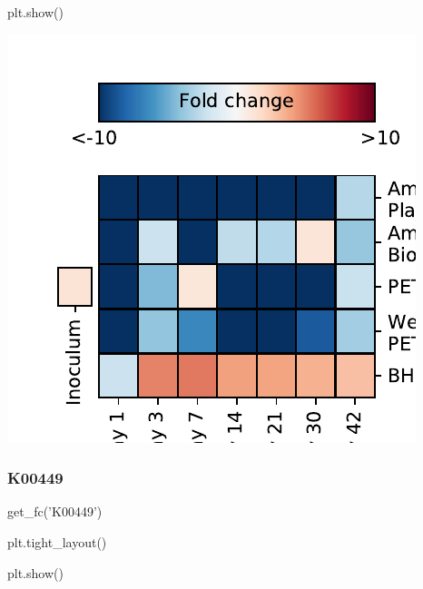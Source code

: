 \documentclass[
]{article}
\newenvironment{Shaded}{\begin{snugshade}}{\end{snugshade}}
\newcommand{\NormalTok}[1]{#1}
\newcommand{\StringTok}[1]{\textcolor[rgb]{0.31,0.60,0.02}{#1}}
\begin{document}
\begin{Shaded}
\begin{Highlighting}[]
\NormalTok{plt.show()}
\end{Highlighting}
\end{Shaded}

\includegraphics{20-6-15-PET-plastisphere-PICRUSt2_files/figure-latex/plot_fc_K00448-1.pdf}

\hypertarget{k00449-1}{%
\subsubsection{K00449}\label{k00449-1}}

\begin{Shaded}
\begin{Highlighting}[]
\NormalTok{get_fc(}\StringTok{'K00449'}\NormalTok{)}
\end{Highlighting}
\end{Shaded}

\begin{Shaded}
\begin{Highlighting}[]
\NormalTok{plt.tight_layout()}
\end{Highlighting}
\end{Shaded}

\begin{Shaded}
\begin{Highlighting}[]
\NormalTok{plt.show()}
\end{Highlighting}
\end{Shaded}
\end{document}
